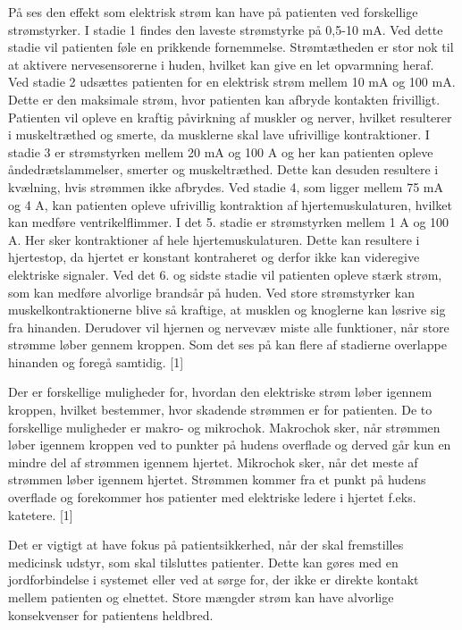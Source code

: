 På  ses den effekt som elektrisk strøm kan have på patienten ved forskellige strømstyrker. I stadie 1 findes den laveste strømstyrke på 0,5-10 mA. Ved dette stadie vil patienten føle en prikkende fornemmelse. Strømtætheden er stor nok til at aktivere nervesensorerne i huden, hvilket kan give en let opvarmning heraf. Ved stadie 2 udsættes patienten for en elektrisk strøm mellem 10 mA og 100 mA. Dette er den maksimale strøm, hvor patienten kan afbryde kontakten frivilligt. Patienten vil opleve en kraftig påvirkning af muskler og nerver, hvilket resulterer i muskeltræthed og smerte, da musklerne skal lave ufrivillige kontraktioner. I stadie 3 er strømstyrken mellem 20 mA og 100 A og her kan patienten opleve åndedrætslammelser, smerter og muskeltræthed. Dette kan desuden resultere i kvælning, hvis strømmen ikke afbrydes. Ved stadie 4, som ligger mellem 75 mA og 4 A, kan patienten opleve ufrivillig kontraktion af hjertemuskulaturen, hvilket kan medføre ventrikelflimmer. I det 5. stadie er strømstyrken mellem 1 A og 100 A. Her sker kontraktioner af hele hjertemuskulaturen. Dette kan resultere i hjertestop, da hjertet er konstant kontraheret og derfor ikke kan videregive elektriske signaler. Ved det 6. og sidste stadie vil patienten opleve stærk strøm, som kan medføre alvorlige brandsår på huden. Ved store strømstyrker kan muskelkontraktionerne blive så kraftige, at musklen og knoglerne kan løsrive sig fra hinanden. Derudover vil hjernen og nervevæv miste alle funktioner, når store strømme løber gennem kroppen. Som det ses på  kan flere af stadierne overlappe hinanden og foregå samtidig. [1]

Der er forskellige muligheder for, hvordan den elektriske strøm løber igennem kroppen, hvilket bestemmer, hvor skadende strømmen er for patienten. De to forskellige muligheder er makro- og mikrochok. Makrochok sker, når strømmen løber igennem kroppen ved to punkter på hudens overflade og derved går kun en mindre del af strømmen igennem hjertet. Mikrochok sker, når det meste af strømmen løber igennem hjertet. Strømmen kommer fra et punkt på hudens overflade og forekommer hos patienter med elektriske ledere i hjertet f.eks. katetere. [1]

Det er vigtigt at have fokus på patientsikkerhed, når der skal fremstilles medicinsk udstyr, som skal tilsluttes patienter. Dette kan gøres med en jordforbindelse i systemet eller ved at sørge for, der ikke er direkte kontakt mellem patienten og elnettet. Store mængder strøm kan have alvorlige konsekvenser for patientens heldbred. 


